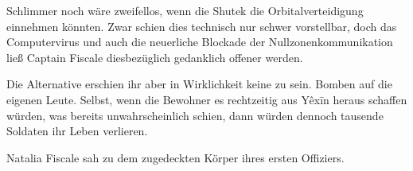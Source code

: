 \par

Schlimmer noch wäre zweifellos, wenn die Shutek die Orbitalverteidigung einnehmen könnten. Zwar schien dies technisch nur schwer vorstellbar, doch das Computervirus und auch die neuerliche Blockade der Nullzonenkommunikation ließ Captain Fiscale diesbezüglich gedanklich offener werden.

\par

Die Alternative erschien ihr aber in Wirklichkeit keine zu sein. Bomben auf die eigenen Leute. Selbst, wenn die Bewohner es rechtzeitig aus Yêxīn heraus schaffen würden, was bereits unwahrscheinlich schien, dann würden dennoch tausende Soldaten ihr Leben verlieren.

\par

Natalia Fiscale sah zu dem zugedeckten Körper ihres ersten Offiziers.
